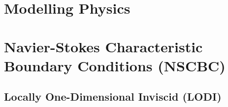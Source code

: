 



\section{Modelling Physics}



\section{Navier-Stokes Characteristic Boundary Conditions (NSCBC)}




\subsection{Locally One-Dimensional Inviscid (LODI)}


